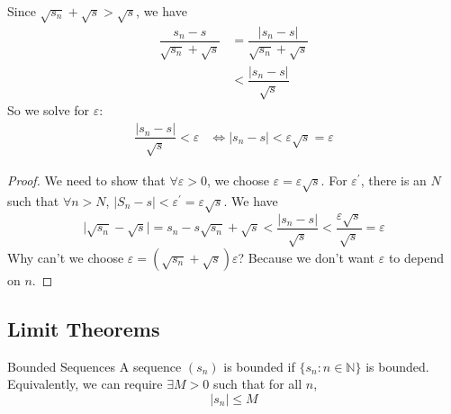 \documentclass{report}
\begin{document}
\begin{examples}
\begin{example}
        Since $\sqrt{s_{n}} + \sqrt{s} > \sqrt{s}$, we have
            \begin{align*}
                \dfrac{s_{n} - s}{\sqrt{s_{n}} + \sqrt{s}} &=  \dfrac{\lvert s_{n} - s \rvert}{\sqrt{s_{n}} + \sqrt{s}} \\
                                                           &<  \dfrac{\lvert s_{n} - s \rvert}{\sqrt{s}}                  
            \end{align*}
        So we solve for $\varepsilon$:
            \begin{align*}
                \dfrac{\lvert s_{n} - s \rvert}{\sqrt{s}} < \varepsilon &\iff  \lvert s_{n} - s \rvert < \varepsilon\sqrt{s} = \varepsilon   
            \end{align*}
        \begin{proof}
            We need to show that $\forall \varepsilon > 0$, we choose $\varepsilon = \varepsilon\sqrt{s}$. For $\varepsilon^{\prime}$, there is an $N$ such that $\forall n > N$, $\lvert S_{n} - s \rvert < \varepsilon^{\prime} = \varepsilon\sqrt{s}$. We have
                \begin{equation*}
                    \lvert \sqrt{s_{n}} - \sqrt{s} \rvert = {s_{n} - s}{\sqrt{s_{n}} + \sqrt{s}} < \dfrac{\lvert s_{n} - s \rvert}{\sqrt{s}} < \frac{\varepsilon\sqrt{s}}{\sqrt{s}} = \varepsilon
                \end{equation*}
            Why can't we choose $\varepsilon = (\sqrt{s_{n}} + \sqrt{s}) \varepsilon$? Because we don't want $\varepsilon$ to depend on $n$.
        \end{proof}
    \end{example}
\end{examples}

\begin{topic}
    \section{Limit Theorems}
\end{topic}

\begin{definition}{Bounded Sequences}
    A sequence $(s_{n})$ is bounded if $\{s_{n} : n \in \mathbb{N}\}$ is bounded. Equivalently, we can require $\exists M > 0$ such that for all $n$, 
        \begin{equation*}
            \lvert s_{n} \rvert \leq M
        \end{equation*}
\end{definition}
\end{document}
